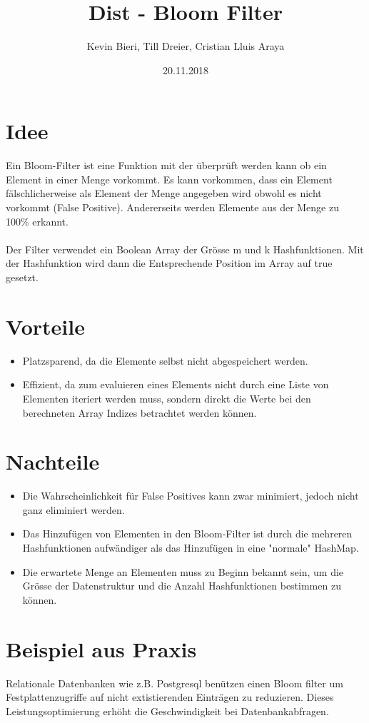 \documentclass{article}
\title{Dist - Bloom Filter}
\author{Kevin Bieri, Till Dreier, Cristian Lluis Araya}
\date{20.11.2018}
\begin{document}
\maketitle

\section{Idee}
Ein Bloom-Filter ist eine Funktion mit der überprüft werden kann ob ein Element in einer Menge vorkommt. Es kann vorkommen, dass ein Element fälschlicherweise als Element der Menge angegeben wird obwohl es nicht vorkommt (False Positive). Andererseits werden Elemente aus der Menge zu 100\% erkannt.
\\
\\
Der Filter verwendet ein Boolean Array der Grösse {m} und {k} Hashfunktionen. Mit der Hashfunktion wird dann die Entsprechende Position im Array auf true gesetzt.\citep{wikipediaBloomFilter}

\section{Vorteile}
\begin{itemize}
\item Platzsparend, da die Elemente selbst nicht abgespeichert werden.
\item Effizient, da zum evaluieren eines Elements nicht durch eine Liste von Elementen iteriert werden muss, sondern direkt die Werte bei den berechneten Array Indizes betrachtet werden können.
\end{itemize}

\section{Nachteile}
\begin{itemize}
\item Die Wahrscheinlichkeit für False Positives kann zwar minimiert, jedoch nicht ganz eliminiert werden.
\item Das Hinzufügen von Elementen in den Bloom-Filter ist durch die mehreren Hashfunktionen aufwändiger als das Hinzufügen in eine "normale" HashMap.
\item Die erwartete Menge an Elementen muss zu Beginn bekannt sein, um die Grösse der Datenstruktur und die Anzahl Hashfunktionen bestimmen zu können.
\end{itemize}

\section{Beispiel aus Praxis}
Relationale Datenbanken wie z.B. Postgresql benützen einen Bloom filter um Festplattenzugriffe auf nicht extistierenden Einträgen zu reduzieren. Dieses Leistungsoptimierung erhöht die Geschwindigkeit bei Datenbankabfragen.\citep{wikipediaApplications}
\end{document}
